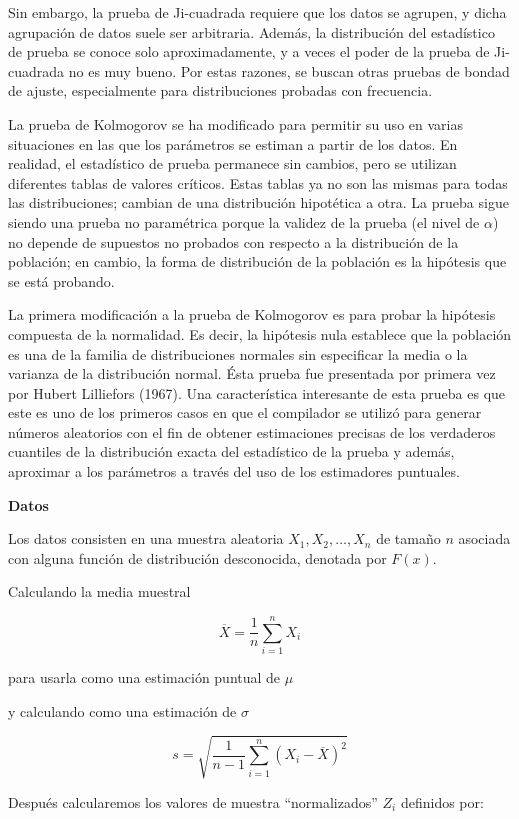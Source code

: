 \documentclass[
  a4paper,
  oneside,
  openany]{book}
\begin{document}
Sin embargo, la prueba de Ji-cuadrada requiere que los datos se agrupen, y dicha agrupación de datos suele ser arbitraria. Además, la distribución del estadístico de prueba se conoce solo aproximadamente, y a veces el poder de la prueba de Ji-cuadrada no es muy bueno. Por estas razones, se buscan otras pruebas de bondad de ajuste, especialmente para distribuciones probadas con frecuencia.

La prueba de Kolmogorov se ha modificado para permitir su uso en varias situaciones en las que los parámetros se estiman a partir de los datos. En realidad, el estadístico de prueba permanece sin cambios, pero se utilizan diferentes tablas de valores críticos. Estas tablas ya no son las mismas para todas las distribuciones; cambian de una distribución hipotética a otra. La prueba sigue siendo una prueba no paramétrica porque la validez de la prueba (el nivel de \(\alpha\)) no depende de supuestos no probados con respecto a la distribución de la población; en cambio, la forma de distribución de la población es la hipótesis que se está probando.

La primera modificación a la prueba de Kolmogorov es para probar la hipótesis compuesta de la normalidad. Es decir, la hipótesis nula establece que la población es una de la familia de distribuciones normales sin especificar la media o la varianza de la distribución normal. Ésta prueba fue presentada por primera vez por Hubert Lilliefors (1967). Una característica interesante de esta prueba es que este es uno de los primeros casos en que el compilador se utilizó para generar números aleatorios con el fin de obtener estimaciones precisas de los verdaderos cuantiles de la distribución exacta del estadístico de la prueba y además, aproximar a los parámetros a través del uso de los estimadores puntuales.

\textbf{Datos}

Los datos consisten en una muestra aleatoria \(X_{1},X_{2},\ldots,X_{n}\) de tamaño \(n\) asociada con alguna función de distribución desconocida, denotada por \(F(x)\).

Calculando la media muestral

\[\overline{X}=\frac{1}{n}\sum_{i=1}^{n}X_{i}\]

para usarla como una estimación puntual de \(\mu\)

y calculando como una estimación de \(\sigma\)

\[s=\sqrt{\frac{1}{n-1}\sum_{i=1}^{n}(X_{i}-\overline{X})^2}\]

Después calcularemos los valores de muestra ``normalizados'' \(Z_{i}\) definidos por:
\end{document}
